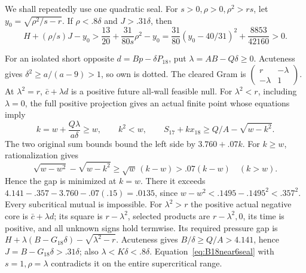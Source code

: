 \documentclass[11pt]{article}
\theoremstyle{definition}
\theoremstyle{remark}
\begin{document}
We shall repeatedly use one quadratic seal.
For \(s>0,\rho>0,\rho^2>rs\), let
\(y_0=\sqrt{\rho^2/s-r}\).
If \(\rho<.8\delta\) and \(J>.31\delta\), then
\begin{equation}\label{eq:B18near6seal}
 H+(\rho/s)J-y_0
 >\frac{13}{20}+\frac{31}{80s}\rho^2-y_0
 =\frac{31}{80}(y_0-40/31)^2+\frac{8853}{42160}>0 .
\end{equation}

For an isolated short opposite \(d=Bp-\delta P_{18}\), put
\(\lambda=AB-Q\delta\geq0\).
Acuteness gives \(\delta^2\geq a/(a-9)>1\), so own is dotted.
The cleared Gram is
\(\left(\begin{smallmatrix}r&-\lambda\\-\lambda&1\end{smallmatrix}\right)\).
At \(\lambda^2=r\), \(\bar c+\lambda d\) is a positive
future all-wall feasible null.
For \(\lambda^2<r\), including \(\lambda=0\), the full positive
projection gives an actual finite point whose equations imply
\[
 k=w+\frac{Q\lambda}{a\delta}\geq w,\qquad k^2<w,\qquad
 S_{17}+kx_{18}\geq Q/A-\sqrt{w-k^2}.
\]
The two original sum bounds bound the left side by \(3.760+.07k\).
For \(k\geq w\), rationalization gives
\[
 \sqrt{w-w^2}-\sqrt{w-k^2}
 \geq\sqrt w\,(k-w)>.07(k-w)\quad(k>w).
\]
Hence the gap is minimized at \(k=w\). There it exceeds
\(4.141-.357-3.760-.07(.15)=.0135\), since
\(w-w^2<.1495-.1495^2<.357^2\).
Every subcritical mutual is impossible.
For \(\lambda^2>r\) the positive actual negative core is
\(\bar c+\lambda d\); its square is \(r-\lambda^2\),
selected products are \(r-\lambda^2,0\), its time is positive,
and all unknown signs hold termwise.
Its required pressure gap is
\(H+\lambda(B-G_{18}\delta)-\sqrt{\lambda^2-r}\).
Acuteness gives \(B/\delta\geq Q/A>4.141\), hence
\(J=B-G_{18}\delta>.31\delta\);
also \(\lambda<K\delta<.8\delta\).
Equation~\eqref{eq:B18near6seal} with \(s=1,\rho=\lambda\)
contradicts it on the entire supercritical range.
\end{document}
